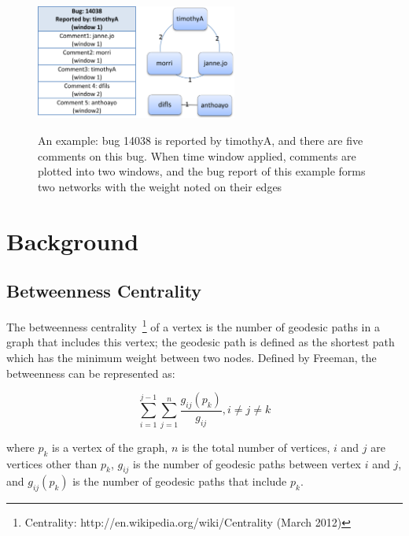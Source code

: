\documentclass[10pt, conference, compsocconf]{IEEEtran}
\begin{document}

\begin{figure}[!t]
\centerline{\includegraphics[width=2.6in,height = 3.8cm]{graph.png}
\label{graph}}
\caption{An example: bug 14038 is reported by timothyA, and there are
  five comments on this bug. 
When time window applied, comments are plotted into two windows, and
the bug report of this example forms two networks with the weight
noted on their edges}

\end{figure}

\section{Background}
\label{background}
\subsection{Betweenness Centrality}

The betweenness centrality~\footnote[2]{Centrality:
  http://en.wikipedia.org/wiki/Centrality (March 2012)} of
a vertex is the number of geodesic paths in a graph that includes this
vertex;
the geodesic path is defined as the shortest path which has the
minimum weight between two nodes. 
Defined by Freeman, the betweenness can be represented as:

\begin{equation} 
\sum_{i=1}^{j-1}\sum_{j=1}^{n}\frac{g_{ij}(p_k)}{g_{ij}}, i\neq j \neq k
\end{equation}

where $p_k$ is a vertex of the graph, $n$ is the total number of
vertices, $i$ and $j$ are vertices other than $p_k$, $g_{ij}$ is the
number of geodesic paths between vertex $i$ and $j$, and $g_{ij}(p_k)$
is the number of geodesic paths that include $p_k$.
\end{document}
